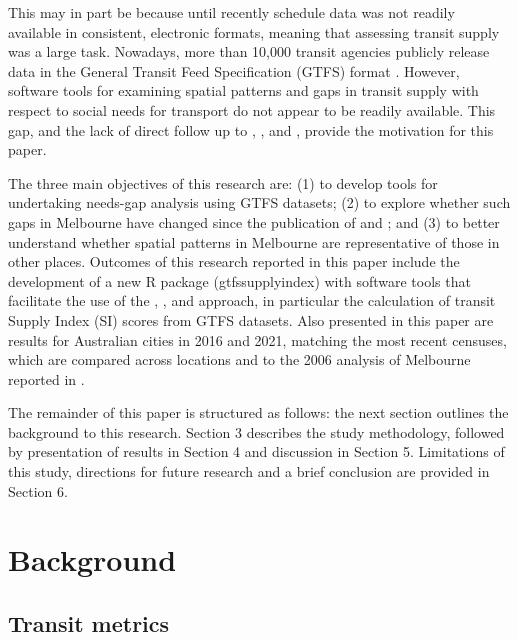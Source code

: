 \documentclass[preprint, 3p,
authoryear]{elsarticle} %
\begin{document}
This may in part be because until recently schedule data was not readily
available in consistent, electronic formats, meaning that assessing
transit supply was a large task. Nowadays, more than 10,000 transit
agencies publicly release data in the General Transit Feed Specification
(GTFS) format \citep{GTFS}. However, software tools for examining
spatial patterns and gaps in transit supply with respect to social needs
for transport do not appear to be readily available. This gap, and the
lack of direct follow up to \citet{Currie2003Hobart},
\citet{Currie2004Gap}, \citet{Currie2007Identifying} and
\citet{currie2010identifying}, provide the motivation for this paper.

The three main objectives of this research are: (1) to develop tools for
undertaking needs-gap analysis using GTFS datasets; (2) to explore
whether such gaps in Melbourne have changed since the publication of
\citet{Currie2007Identifying} and \citet{currie2010identifying}; and (3)
to better understand whether spatial patterns in Melbourne are
representative of those in other places. Outcomes of this research
reported in this paper include the development of a new R package
(gtfssupplyindex) with software tools that facilitate the use of the
\citet{Currie2003Hobart}, \citet{Currie2004Gap},
\citet{Currie2007Identifying} and \citet{currie2010identifying}
approach, in particular the calculation of transit Supply Index (SI)
scores from GTFS datasets. Also presented in this paper are results for
Australian cities in 2016 and 2021, matching the most recent censuses,
which are compared across locations and to the 2006 analysis of
Melbourne reported in \citet{currie2010identifying}.

The remainder of this paper is structured as follows: the next section
outlines the background to this research. Section 3 describes the study
methodology, followed by presentation of results in Section 4 and
discussion in Section 5. Limitations of this study, directions for
future research and a brief conclusion are provided in Section 6.

\section{Background}\label{background}

\subsection{Transit metrics}\label{transit-metrics}
\end{document}
